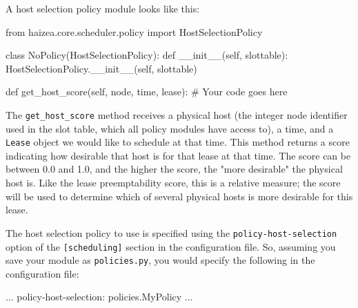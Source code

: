 A host selection policy module looks like this:

\begin{wideshellverbatim}
from haizea.core.scheduler.policy import HostSelectionPolicy

class NoPolicy(HostSelectionPolicy):
    def __init__(self, slottable):
        HostSelectionPolicy.__init__(self, slottable)
    
    
    def get_host_score(self, node, time, lease):       
        # Your code goes here
\end{wideshellverbatim}

The \texttt{get\_host\_score} method receives a physical host (the integer node identifier used in the slot table, which all policy modules have access to), a time, and a \texttt{Lease} object we would like to schedule at that time. This method returns a score indicating how desirable that host is for that lease at that time. The score can be between 0.0 and 1.0, and the higher the score,       the "more desirable" the physical host is. Like the lease preemptability score, this is a relative measure; the score will be used to determine which of several physical hosts is more desirable for this lease.

The host selection policy to use is specified using the \texttt{policy-host-selection} option of the \texttt{[scheduling]} section in the configuration file. So, assuming you save your module as \texttt{policies.py}, you would specify the following in the configuration file:

\begin{wideshellverbatim}
[scheduling]
...
policy-host-selection: policies.MyPolicy
...
\end{wideshellverbatim}
